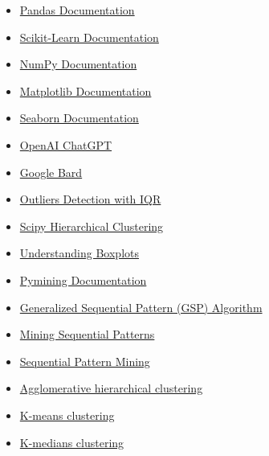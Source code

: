 \documentclass[11pt, a4paper, oneside]{Thesis} %
\begin{document}
\begin{itemize}
  \item \href{https://pandas.pydata.org/pandas-docs/stable/}{Pandas Documentation} \cite{pandas}
  \item \href{https://scikit-learn.org/stable/}{Scikit-Learn Documentation} \cite{scikit-learn}
  \item \href{https://numpy.org/doc/stable/}{NumPy Documentation} \cite{numpy}
  \item \href{https://matplotlib.org/stable/contents.html}{Matplotlib Documentation} \cite{matplotlib}
  \item \href{https://seaborn.pydata.org/}{Seaborn Documentation} \cite{seaborn}
  \item \href{https://openai.com/chatgpt}{OpenAI ChatGPT} \cite{chatgpt}
  \item \href{https://bard.google.com/}{Google Bard} \cite{google_bard}
  \item \href{https://www.geeksforgeeks.org/interquartile-range-to-detect-outliers-in-data/}{Outliers Detection with IQR} \cite{iqr_outliers}
  \item \href{https://docs.scipy.org/doc/scipy/reference/generated/scipy.cluster.hierarchy.linkage.html}{Scipy Hierarchical Clustering} \cite{scipy_hierarchical_clustering}
  \item \href{https://towardsdatascience.com/understanding-boxplots-5e2df7bcbd51}{Understanding Boxplots} \cite{boxplots}
  \item \href{https://pymining.readthedocs.io/en/latest/index.html}{Pymining Documentation} \cite{pymining}
  \item \href{https://en.wikipedia.org/wiki/Sequential_Pattern_Mining}{Generalized Sequential Pattern (GSP) Algorithm} \cite{gsp_algorithm}
  \item \href{https://dl.acm.org/doi/10.1145/223784.223791}{Mining Sequential Patterns} \cite{agrawal1995mining}
  \item \href{https://www.geeksforgeeks.org/sequential-pattern-mining/}{Sequential Pattern Mining} \cite{sequential_pattern_mining}
  \item \href{https://en.wikipedia.org/wiki/Hierarchical_clustering#Agglomerative_hierarchical_clustering}{Agglomerative hierarchical clustering} \cite{agglomerative_clustering}
  \item \href{https://en.wikipedia.org/wiki/K-means_clustering}{K-means clustering} \cite{k_means}
  \item \href{https://en.wikipedia.org/wiki/K-medians_clustering}{K-medians clustering} \cite{k_medians}

\end{itemize}
\end{document}
